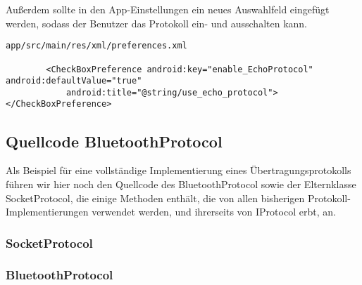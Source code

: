 Außerdem sollte in den App-Einstellungen ein neues Auswahlfeld eingefügt werden, sodass der Benutzer das Protokoll ein- und ausschalten kann.

\begin{lstlisting}
app/src/main/res/xml/preferences.xml

        <CheckBoxPreference android:key="enable_EchoProtocol" android:defaultValue="true"
            android:title="@string/use_echo_protocol"></CheckBoxPreference>
\end{lstlisting}




\subsection{Quellcode BluetoothProtocol}

Als Beispiel für eine vollständige Implementierung eines Übertragungsprotokolls führen wir hier noch den Quellcode des BluetoothProtocol sowie der Elternklasse SocketProtocol, die einige Methoden enthält, die von allen bisherigen Protokoll-Implementierungen verwendet werden, und ihrerseits von IProtocol erbt, an.

\subsubsection{SocketProtocol}


\subsubsection{BluetoothProtocol}



